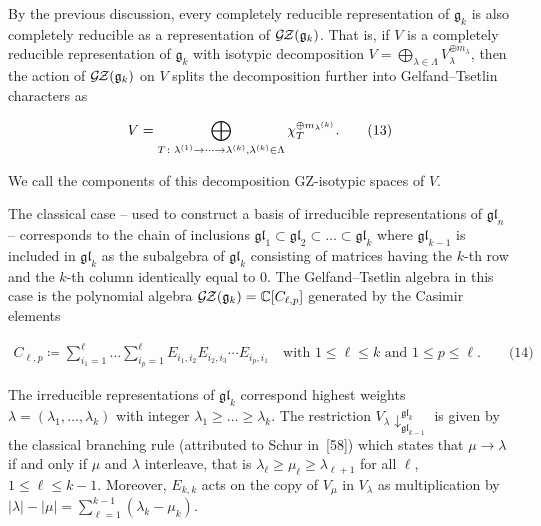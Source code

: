 By the previous discussion, every completely reducible representation of $\mathfrak{g}_{k}$ is also completely reducible as a representation of $\mathcal{G}\hskip-1.00006pt\mathcal{Z}(\mathfrak{g}_{k})$.
That is, if $V$ is a completely reducible representation of $\mathfrak{g}_{k}$ with isotypic decomposition $V=\bigoplus_{\lambda\in\Lambda}V_{\lambda}^{\oplus m_{\lambda}}$, then the action of $\mathcal{G}\hskip-1.00006pt\mathcal{Z}(\mathfrak{g}_{k})$ on $V$ splits the decomposition further into Gelfand–Tsetlin characters as



\[\begin{aligned}
\displaystyle V=\bigoplus\limits_{T\colon\lambda^{(1)}\to\dots\to\lambda^{(k)},\lambda^{(k)}\in\Lambda}\chi_{T}^{\oplus m_{\smash{\lambda^{(k)}}}}.\qquad\text{(13)}
\end{aligned}\]


We call the components of this decomposition GZ-isotypic spaces of $V$.





The classical case – used to construct a basis of irreducible representations of $\mathfrak{gl}_{n}$ – corresponds to the chain of inclusions $\mathfrak{gl}_{1}\subset\mathfrak{gl}_{2}\subset\dots\subset\mathfrak{gl}_{k}$ where $\mathfrak{gl}_{k-1}$ is included in $\mathfrak{gl}_{k}$ as the subalgebra of $\mathfrak{gl}_{k}$ consisting of matrices having the $k$-th row and the $k$-th column identically equal to $0$. The Gelfand–Tsetlin algebra in this case is the polynomial algebra $\mathcal{G}\hskip-1.00006pt\mathcal{Z}(\mathfrak{g}_{k})=\mathbb{C}[C_{\ell,p}]$ generated by the Casimir elements



\[\begin{aligned}
\displaystyle C_{\ell,p}\coloneqq\sum_{i_{1}=1}^{\ell}\dots\sum_{i_{p}=1}^{\ell}E_{i_{1},i_{2}}E_{i_{2},i_{3}}\cdots E_{i_{p},i_{1}}\quad\text{with }1\leq\ell\leq k\text{ and }1\leq p\leq\ell.\qquad\text{(14)}
\end{aligned}\]




The irreducible representations of $\mathfrak{gl}_{k}$ correspond highest weights $\lambda=(\lambda_{1},\dots,\lambda_{k})$ with integer $\lambda_{1}\geq\dots\geq\lambda_{k}$.
The restriction $V_{\lambda}{\downarrow}^{\mathfrak{gl}_{k}}_{\mathfrak{gl}_{k-1}}$ is given by the classical branching rule (attributed to Schur in [58]) which states that $\mu\to\lambda$ if and only if $\mu$ and $\lambda$ interleave, that is $\lambda_{\ell}\geq\mu_{\ell}\geq\lambda_{\ell+1}$ for all $\ell$, $1\leq\ell\leq k-1$.
Moreover, $E_{k,k}$ acts on the copy of $V_{\mu}$ in $V_{\lambda}$ as multiplication by $|\lambda|-|\mu|=\sum_{\ell=1}^{k-1}(\lambda_{k}-\mu_{k})$.





